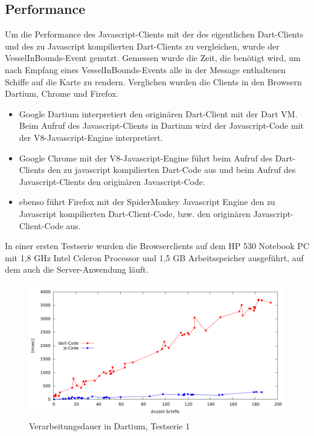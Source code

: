 \subsection{Performance}
Um die Performance des Javascript-Clients mit der des eigentlichen Dart-Clients und des zu Javascript kompilierten Dart-Clients zu vergleichen, wurde der VesselInBounds-Event genutzt. Gemessen wurde die Zeit, die benötigt wird, um nach Empfang eines VesselInBounds-Events alle in der Message enthaltenen Schiffe auf die Karte zu rendern. Verglichen wurden die Clients in den Browsern Dartium, Chrome und Firefox.
\begin{itemize}
\item Google Dartium interpretiert den originären Dart-Client mit der Dart VM. Beim Aufruf des Javascript-Clients in Dartium wird der Javascript-Code mit der V8-Javascript-Engine interpretiert.
\item Google Chrome  mit der V8-Javascript-Engine führt beim Aufruf des Dart-Clients den zu javascript kompilierten Dart-Code aus und beim Aufruf des Javascript-Clients den originären Javascript-Code.
\item ebenso führt Firefox mit der SpiderMonkey Javascript Engine den zu Javascript kompilierten Dart-Client-Code, bzw. den originären Javascript-Client-Code aus.
\end {itemize}
\newpage
In einer ersten Testserie wurden die Browserclients auf dem HP 530 Notebook PC mit 1,8 GHz Intel Celeron Processor und 1,5 GB Arbeitsspeicher ausgeführt, auf dem auch die Server-Anwendung läuft.

\begin {figure}[H]
\begin{center}
  \includegraphics[height=2.3in]{images/Dartium.png}
\end{center}
 \caption{Verarbeitungsdauer in Dartium, Testserie 1}
\end {figure}


